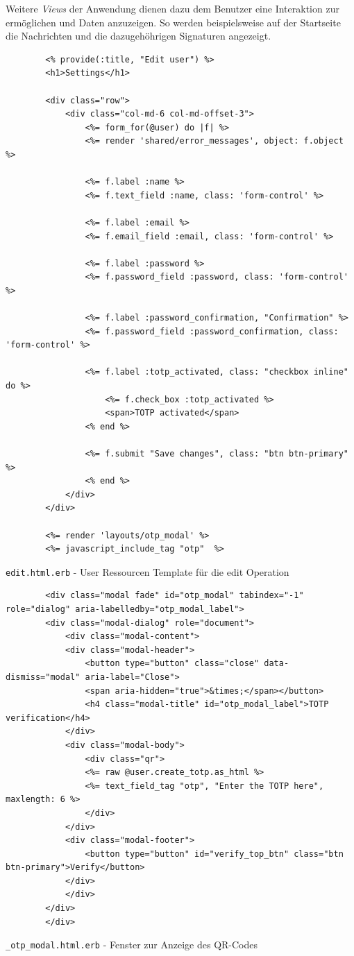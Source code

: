 \documentclass[11pt,a4paper,ngerman]{scrreprt}
\begin{document}
Weitere \textit{Views} der Anwendung dienen dazu dem Benutzer eine Interaktion zur ermöglichen und Daten anzuzeigen. So werden beispielsweise auf der Startseite die Nachrichten und die dazugehöhrigen Signaturen angezeigt.
\begin{listing}[htpb]
    \begin{verbatim}
        <% provide(:title, "Edit user") %>
        <h1>Settings</h1>

        <div class="row">
            <div class="col-md-6 col-md-offset-3">
                <%= form_for(@user) do |f| %>
                <%= render 'shared/error_messages', object: f.object %>

                <%= f.label :name %>
                <%= f.text_field :name, class: 'form-control' %>

                <%= f.label :email %>
                <%= f.email_field :email, class: 'form-control' %>

                <%= f.label :password %>
                <%= f.password_field :password, class: 'form-control' %>

                <%= f.label :password_confirmation, "Confirmation" %>
                <%= f.password_field :password_confirmation, class: 'form-control' %>

                <%= f.label :totp_activated, class: "checkbox inline" do %>
                    <%= f.check_box :totp_activated %>
                    <span>TOTP activated</span>
                <% end %>

                <%= f.submit "Save changes", class: "btn btn-primary" %>
                <% end %>
            </div>
        </div>

        <%= render 'layouts/otp_modal' %>
        <%= javascript_include_tag "otp"  %>
    \end{verbatim}
    \caption{\texttt{edit.html.erb} - User Ressourcen Template für die edit Operation}
    \label{lst:edit.html.erb}
\end{listing}
\begin{listing}[htpb]
    \begin{verbatim}
        <div class="modal fade" id="otp_modal" tabindex="-1" role="dialog" aria-labelledby="otp_modal_label">
        <div class="modal-dialog" role="document">
            <div class="modal-content">
            <div class="modal-header">
                <button type="button" class="close" data-dismiss="modal" aria-label="Close">
                <span aria-hidden="true">&times;</span></button>
                <h4 class="modal-title" id="otp_modal_label">TOTP verification</h4>
            </div>
            <div class="modal-body">
                <div class="qr">
                <%= raw @user.create_totp.as_html %>
                <%= text_field_tag "otp", "Enter the TOTP here", maxlength: 6 %>
                </div>
            </div>
            <div class="modal-footer">
                <button type="button" id="verify_top_btn" class="btn btn-primary">Verify</button>
            </div>
            </div>
        </div>
        </div>
    \end{verbatim}
    \caption{\texttt{\_otp\_modal.html.erb} - Fenster zur Anzeige des QR-Codes}
    \label{lst:otp_modal.html.erb}
\end{listing}
\end{document}
